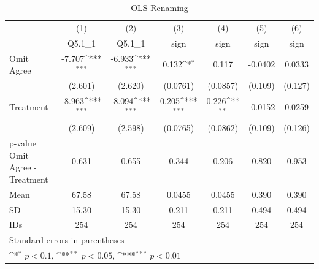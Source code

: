 \begin{table}[htbp]\centering
\def\sym#1{\ifmmode^{#1}\else\(^{#1}\)\fi}
\caption{OLS Renaming}
\begin{tabular}{l*{6}{c}}
\hline\hline
                                &\multicolumn{1}{c}{(1)}&\multicolumn{1}{c}{(2)}&\multicolumn{1}{c}{(3)}&\multicolumn{1}{c}{(4)}&\multicolumn{1}{c}{(5)}&\multicolumn{1}{c}{(6)}\\
                                &\multicolumn{1}{c}{Q5.1\_1}&\multicolumn{1}{c}{Q5.1\_1}&\multicolumn{1}{c}{sign}&\multicolumn{1}{c}{sign}&\multicolumn{1}{c}{sign}&\multicolumn{1}{c}{sign}\\
\hline
Omit Agree                      &   -7.707\sym{***}&   -6.933\sym{***}&    0.132\sym{*}  &    0.117         &  -0.0402         &   0.0333         \\
                                &  (2.601)         &  (2.620)         & (0.0761)         & (0.0857)         &  (0.109)         &  (0.127)         \\
Treatment                       &   -8.963\sym{***}&   -8.094\sym{***}&    0.205\sym{***}&    0.226\sym{**} &  -0.0152         &   0.0259         \\
                                &  (2.609)         &  (2.598)         & (0.0765)         & (0.0862)         &  (0.109)         &  (0.126)         \\
\hline
p-value Omit Agree - Treatment  &    0.631         &    0.655         &    0.344         &    0.206         &    0.820         &    0.953         \\
Mean                            &    67.58         &    67.58         &   0.0455         &   0.0455         &    0.390         &    0.390         \\
SD                              &    15.30         &    15.30         &    0.211         &    0.211         &    0.494         &    0.494         \\
IDs                             &      254         &      254         &      254         &      254         &      254         &      254         \\
\hline\hline
\multicolumn{7}{l}{\footnotesize Standard errors in parentheses}\\
\multicolumn{7}{l}{\footnotesize \sym{*} \(p<0.1\), \sym{**} \(p<0.05\), \sym{***} \(p<0.01\)}\\
\end{tabular}
\end{table}
